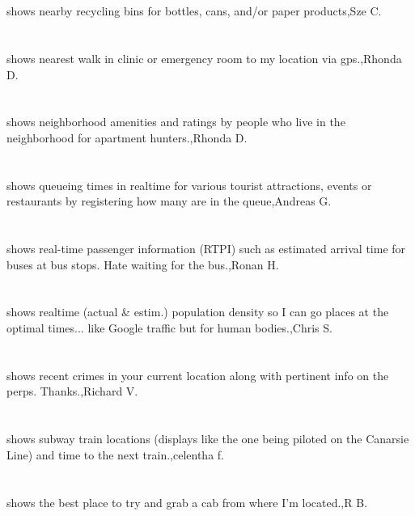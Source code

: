 \section{}shows nearby recycling bins for bottles, cans, and/or paper products,Sze C.	
\section{}  shows nearest walk in clinic or emergency room to my location via gps.,Rhonda D.	
\section{}shows neighborhood amenities and ratings by people who live in the neighborhood for apartment hunters.,Rhonda D.	
\section{} shows queueing times in realtime for various tourist attractions, events or restaurants by registering how many are in the queue,Andreas G.	
\section{}shows real-time passenger information (RTPI) such as estimated arrival time for buses at bus stops.  Hate waiting for the bus.,Ronan H.	
\section{}shows realtime (actual \& estim.) population density so I can go places at the optimal times... like Google traffic but for human bodies.,Chris S.	
\section{}shows recent crimes in your current location along with pertinent info on the perps.  Thanks.,Richard V.	
\section{}shows subway train locations (displays like the one being piloted on the Canarsie Line) and time to the next train.,celentha f.	
\section{}  shows the best place to try and grab a cab from where I'm located.,R B.	
